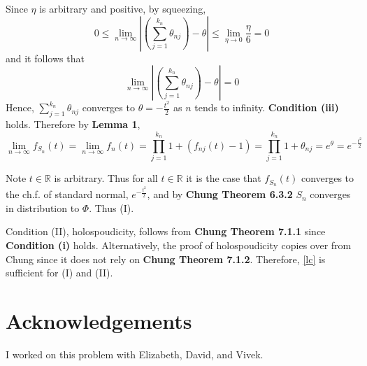 \documentclass[letterpaper, 12pt]{article}
\newcommand{\R}{\mathbb{R}}
\begin{document}
Since $\eta$ is arbitrary and positive, by squeezing,
\[
0 
\leq 
\lim_{n \to \infty}
\left|
\left(
\sum_{j=1}^{k_n} \theta_{nj} 
\right)
- \theta
\right|
\leq 
\lim_{\eta \to 0}
\frac{\eta}{6}
=
0
\]
and it follows that 
\[
\lim_{n \to \infty}
\left|
\left(
\sum_{j=1}^{k_n} \theta_{nj} 
\right)
- \theta
\right| = 0
\]
Hence,
$\sum_{j=1}^{k_n} \theta_{nj} $ converges to $\theta=-\frac{t^2}{2}$ as $n$ tends to infinity. \textbf{Condition (iii)} holds. Therefore by \textbf{Lemma 1}, 
\[
\lim_{n \to \infty}
f_{S_n}(t) 
=
\lim_{n \to \infty}
f_n(t) 
=
\prod_{j=1}^{k_n} 1 + (f_{nj}(t) - 1)
=
\prod_{j=1}^{k_n} 1 + \theta_{nj}
=
e^{\theta}
=
e^{-\frac{t^2}{2}}
\]

Note $t \in \R$ is arbitrary. Thus for all $t \in \R$ it is the case that $f_{S_n}(t)$ converges to the ch.f. of standard normal, $e^{-\frac{t^2}{2}}$, and by \textbf{Chung Theorem 6.3.2} $S_n$ converges in distribution to $\Phi$. Thus (I).

Condition (II), holospoudicity, follows from \textbf{Chung Theorem 7.1.1} since \textbf{Condition (i)} holds. Alternatively, the proof of holospoudicity copies over from Chung since it does not rely on \textbf{Chung Theorem 7.1.2}. Therefore, \eqref{lc} is sufficient for (I) and (II).

\section*{Acknowledgements}
I worked on this problem with Elizabeth, David, and Vivek.
\end{document}
